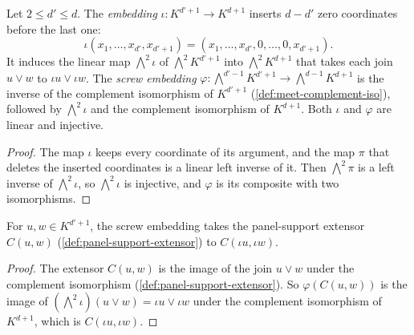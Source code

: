 \begin{definition}
  \label{def:pencil-d-embedding}
  \leanok
  Let $2 \le d' \le d$. The \emph{embedding}
  $\iota \colon K^{d'+1} \to K^{d+1}$ inserts $d - d'$ zero coordinates
  before the last one:
  \[
    \iota(x_1, \dots, x_{d'}, x_{d'+1})
      = (x_1, \dots, x_{d'}, 0, \dots, 0, x_{d'+1}).
  \]
  It induces the linear map $\bigwedge^2 \iota$ of
  $\bigwedge^2 K^{d'+1}$ into $\bigwedge^2 K^{d+1}$ that takes each join
  $u \vee w$ to $\iota u \vee \iota w$. The \emph{screw embedding}
  $\varphi \colon \bigwedge^{d'-1} K^{d'+1} \to \bigwedge^{d-1} K^{d+1}$
  is the inverse of the complement isomorphism of $K^{d'+1}$
  (\cref{def:meet-complement-iso}), followed by $\bigwedge^2 \iota$ and
  the complement isomorphism of $K^{d+1}$. Both $\iota$ and $\varphi$
  are linear and injective.
\end{definition}
\begin{proof}
  \leanok
  The map $\iota$ keeps every coordinate of its argument, and the map
  $\pi$ that deletes the inserted coordinates is a linear left inverse
  of it. Then $\bigwedge^2 \pi$ is a left inverse of $\bigwedge^2 \iota$,
  so $\bigwedge^2 \iota$ is injective, and $\varphi$ is its composite
  with two isomorphisms.
\end{proof}

\begin{lemma}
  \label{lem:pencil-d-embedding-join}
  \leanok
  For $u, w \in K^{d'+1}$, the screw embedding takes the panel-support
  extensor $C(u, w)$ (\cref{def:panel-support-extensor}) to
  $C(\iota u, \iota w)$.
\end{lemma}
\begin{proof}
  \leanok
  The extensor $C(u, w)$ is the image of the join $u \vee w$ under the
  complement isomorphism (\cref{def:panel-support-extensor}). So
  $\varphi(C(u, w))$ is the image of
  $(\bigwedge^2 \iota)(u \vee w) = \iota u \vee \iota w$ under the
  complement isomorphism of $K^{d+1}$, which is
  $C(\iota u, \iota w)$.
\end{proof}

